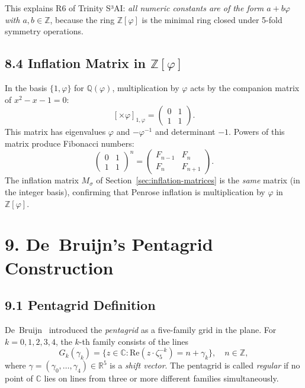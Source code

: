 \noindent
This explains R6 of Trinity S³AI: \emph{all numeric
constants are of the form \(a + b\varphi\) with
\(a, b \in \mathbb{Z}\)}, because the ring
\(\mathbb{Z}[\varphi]\) is the minimal ring closed
under 5-fold symmetry operations.

\subsection{8.4 Inflation Matrix in
\texorpdfstring{$\mathbb{Z}[\varphi]$}{Z[phi]}}\label{sec:inflation-z-phi}

In the basis \(\{1, \varphi\}\) for
\(\mathbb{Q}(\varphi)\), multiplication by
\(\varphi\) acts by the companion matrix of
\(x^2 - x - 1 = 0\):
\[
  [\times\varphi]_{1,\varphi} =
  \begin{pmatrix} 0 & 1 \\ 1 & 1 \end{pmatrix}.
\]
This matrix has eigenvalues \(\varphi\) and
\(-\varphi^{-1}\) and determinant \(-1\). Powers
of this matrix produce Fibonacci numbers:
\[
  \begin{pmatrix} 0 & 1 \\ 1 & 1 \end{pmatrix}^n
  = \begin{pmatrix} F_{n-1} & F_n \\ F_n & F_{n+1} \end{pmatrix}.
\]
The inflation matrix \(M_\sigma\) of
Section~\ref{sec:inflation-matrices} is the
\emph{same} matrix (in the integer basis), confirming
that Penrose inflation is multiplication by
\(\varphi\) in \(\mathbb{Z}[\varphi]\).

\section{9. De~Bruijn's Pentagrid
Construction}\label{sec:debruijn}

\subsection{9.1 Pentagrid Definition}
\label{sec:pentagrid-def}

De~Bruijn~\cite{debruijn1981} introduced the
\emph{pentagrid} as a five-family grid in the
plane. For \(k = 0, 1, 2, 3, 4\), the \(k\)-th
family consists of the lines
\[
  G_k(\gamma_k) = \{z \in \mathbb{C} :
    \mathrm{Re}(z \cdot \zeta_5^{-k}) = n + \gamma_k\},
  \quad n \in \mathbb{Z},
\]
where \(\gamma = (\gamma_0, \ldots, \gamma_4)
\in \mathbb{R}^5\) is a \emph{shift vector}.
The pentagrid is called \emph{regular} if no
point of \(\mathbb{C}\) lies on lines from three
or more different families simultaneously.

